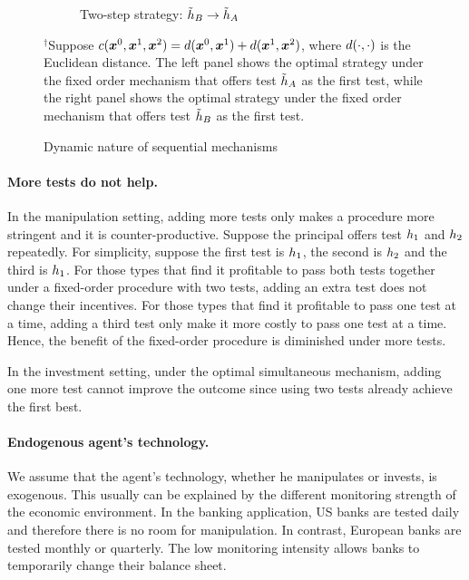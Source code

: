 \begin{figure}[h]
\begin{subfigure}[b]{0.45\linewidth}
\begin{tikzpicture}[xscale=7.8,yscale=7.8]
		\end{tikzpicture}
		\caption{Two-step strategy: $\tilde\classifier_B\rightarrow\tilde\classifier_A$}
		\label{subfig:two step B-A}
	\end{subfigure}
	\caption{Dynamic nature of sequential mechanisms}
	\rule{0in}{1.2em}$^\dag$\scriptsize Suppose $\cost(\orifeatures,\firstfeatures,\secondfeatures)=\metric(\orifeatures,\firstfeatures)+\metric(\firstfeatures,\secondfeatures)$, where $\metric(\cdot,\cdot)$ is the Euclidean distance. The left panel shows the optimal strategy under the fixed order mechanism that offers test $\tilde\classifier_A$ as the first test, while the right panel shows the optimal strategy under the fixed order mechanism that offers test $\tilde\classifier_B$ as the first test.
\end{figure}  

\paragraph{More tests do not help.}
In the manipulation setting, adding more tests only makes a procedure more stringent and it is counter-productive. 
Suppose the principal offers test $\classifier_1$ and $\classifier_2$ repeatedly. For simplicity, suppose the first test is $\classifier_1$, the second is $\classifier_2$ and the third is $\classifier_1$. For those types that find it profitable to pass both tests together under a fixed-order procedure with two tests, adding an extra test does not change their incentives.
For those types that find it profitable to pass one test at a time, adding a third test only make it more costly to pass one test at a time.
Hence, the benefit of the fixed-order procedure is diminished under more tests.

In the investment setting, under the optimal simultaneous mechanism, adding one more test cannot improve the outcome since using two tests already achieve the first best.


\paragraph{Endogenous agent's technology.}
We assume that the agent's technology, whether he manipulates or invests, is exogenous. 
This usually can be explained by the different monitoring strength of the economic environment.
In the banking application, US banks are tested daily and therefore there is no room for manipulation.
In contrast, European banks are tested monthly or quarterly.
The low monitoring intensity allows banks to temporarily change their balance sheet.

